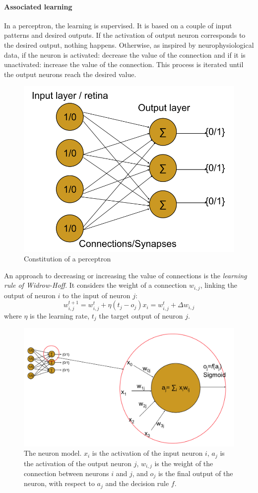 \paragraph{Associated learning} In a perceptron, the learning is supervised. It is based on a couple of input patterns and desired outputs. If the activation of output neuron corresponds to the desired output, nothing happens.
Otherwise, as inspired by neurophysiological data, if the neuron is activated: decrease the value of the connection and if it is unactivated: increase the value of the connection. This process is iterated until the output neurons reach the desired value. 
\begin{figure}[h]
    \centering
    \includegraphics[width=.45\linewidth]{img/perceptron}
    \caption{Constitution of a perceptron}
\end{figure}
An approach to decreasing or increasing the value of  connections is the \textit{learning rule of Widrow-Hoff}. It considers the weight of a connection $w_{i, j}$, linking the output of neuron $i$ to the input of neuron $j$:
\begin{equation*}
    w_{i, j}^{t+1} = w_{i, j}^t + \eta (t_j - o_j) x_i = w_{i, j}^t + \Delta w_{i, j}
\end{equation*}
where $\eta$ is the learning rate, $t_j$ the target output of neuron $j$.
\begin{figure}[h]
    \centering
    \includegraphics[width=.7\linewidth]{img/perceptron2}
    \caption{The neuron model. $x_i$ is the activation of the input neuron $i$, $a_j$ is the activation of the output neuron $j$, $w_{i, j}$ is the weight of the connection between neurons $i$ and $j$, and $o_j$ is the final output of the neuron, with respect to $a_j$ and the decision rule $f$. }
\end{figure}
